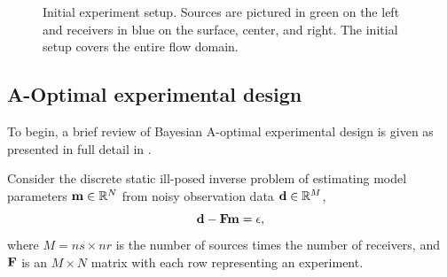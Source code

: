 \documentclass[12pt]{article}
\newcommand {\bfd}   { {\bf d} }
\newcommand {\bfm}   { {\bf m} }
\newcommand {\bfF}  { {\bf F} }
\newcommand{\Sig}{\bf \Sigma}
\begin{document}
\begin{figure}[h!]
\begin{center}
\end{center}
\caption{Initial experiment setup. Sources are pictured in green on the left and receivers in blue on the surface, center, and right. The initial setup covers the entire flow domain.}
\end{figure}




 

\subsection{A-Optimal experimental design } 
To begin, a brief review of Bayesian A-optimal experimental design  is given as presented in full detail in \cite{habera} \cite{Alexanderian}. 

\bigskip

Consider the discrete static  ill-posed inverse problem of estimating  model parameters $\bfm \in \mathbb{R}^{N}$ from noisy observation data $\bfd \in \mathbb{R}^{M}$, 
\begin{equation*}
\bfd - \bfF \bfm = {\bf \epsilon},
\end{equation*} 
where $ M = ns \times nr$ is the number of sources times the number of receivers, and $\bfF$ is an $M \times N$ matrix with each row representing an experiment. 
 
\end{document}
